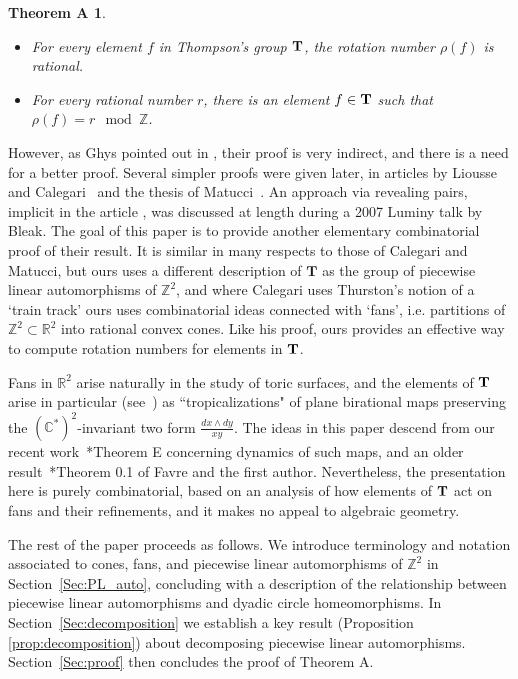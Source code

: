 \documentclass[11pt]{amsart}
\theoremstyle{definition}
\theoremstyle{plain}
\newtheorem*{thmA}{Theorem A}
\theoremstyle{remark}
\numberwithin{equation}{section}
\def\C{\mathbb{C}}
\def\R{\mathbb{R}}
\def\Z{\mathbb{Z}}
\begin{document}
\begin{thmA}\mbox{}
\begin{itemize}
\item[I.]
For every element $f$ in Thompson's group ${\bf T}$, the rotation number $\rho(f)$ is rational.
\item[II.]
For every rational number $r$, there is an element $f\in{\bf T}$ such that $\rho(f)=r\mod\Z$.
\end{itemize}
\end{thmA}

\noindent However, as Ghys pointed out in \cite{Ghys}, their proof is very indirect, and there is a need for a better proof.  
Several simpler proofs were given later, in articles by Liousse \cite{Li} and Calegari~\cite{Cal} and the thesis of Matucci~\cite{Ma}. An approach via revealing pairs, implicit in the article \cite{BBetc}, was discussed at length during a 2007 Luminy talk by Bleak. 
The goal of this paper is to provide another elementary combinatorial proof of their result.
It is similar in many respects to those of Calegari and Matucci, but ours uses a different description of $\mathbf{T}$ as the group of piecewise linear automorphisms of $\Z^2$, and where Calegari uses Thurston's notion of a `train track' ours uses combinatorial ideas connected with `fans', i.e. partitions of $\Z^2\subset\R^2$ into rational convex cones. Like his proof, ours provides an effective way to compute rotation numbers for elements in ${\bf T}$.

Fans in $\R^2$ arise naturally in the study of toric surfaces, and the elements of $\bf T$ arise in particular (see~\cites{Us,Fav}) as ``tropicalizations" of plane birational maps preserving the $(\C^*)^2$-invariant two form $\frac{dx\wedge dy}{xy}$.  The ideas in this paper descend from our recent work~\cite{DL}*{Theorem E} concerning dynamics of such maps, and an older result~\cite{DF}*{Theorem 0.1} of Favre and the first author.  Nevertheless, the presentation here is purely combinatorial, based on an analysis of how elements of $\bf T$ act on fans and their refinements, and it makes no appeal to algebraic geometry.

The rest of the paper proceeds as follows. We introduce terminology and notation associated to cones, fans, and  piecewise linear automorphisms of $\Z^2$ in Section~\ref{Sec:PL_auto}, concluding with a description of the relationship between piecewise linear automorphisms and dyadic circle homeomorphisms.  In Section~\ref{Sec:decomposition} we establish a key result (Proposition \ref{prop:decomposition}) about decomposing piecewise linear automorphisms. Section~\ref{Sec:proof} then concludes the proof of Theorem A.
\end{document}
